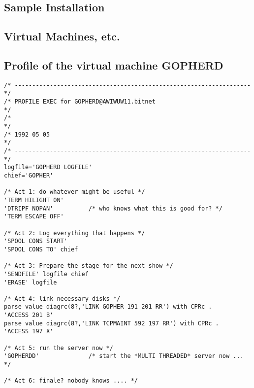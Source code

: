\begin{appendix}



\section{Sample Installation}



\subsection{Virtual Machines, etc.}



\subsection{Profile of the virtual machine GOPHERD}\label{prof.GOPHERD}
\begin{small}
\begin{verbatim}
/* ------------------------------------------------------------------- */
/* PROFILE EXEC for GOPHERD@AWIWUW11.bitnet                            */
/*                                                                     */
/* 1992 05 05                                                          */
/* ------------------------------------------------------------------- */
logfile='GOPHERD LOGFILE'
chief='GOPHER'
 
/* Act 1: do whatever might be useful */
'TERM HILIGHT ON'
'DTRIPF NOPAN'          /* who knows what this is good for? */
'TERM ESCAPE OFF'
 
/* Act 2: Log everything that happens */
'SPOOL CONS START'
'SPOOL CONS TO' chief
 
/* Act 3: Prepare the stage for the next show */
'SENDFILE' logfile chief
'ERASE' logfile
 
/* Act 4: link necessary disks */
parse value diagrc(8?,'LINK GOPHER 191 201 RR') with CPRc .
'ACCESS 201 B'
parse value diagrc(8?,'LINK TCPMAINT 592 197 RR') with CPRc .
'ACCESS 197 X'
 
/* Act 5: run the server now */
'GOPHERDD'              /* start the *MULTI THREADED* server now ... */
 
/* Act 6: finale? nobody knows .... */
\end{verbatim}
\end{small}




\end{appendix}
